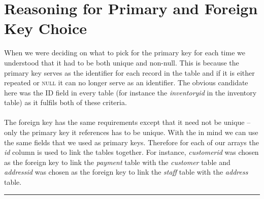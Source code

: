 \documentclass{article}
\begin{document}
\section{Reasoning for Primary and Foreign Key Choice}
	When we were deciding on what to pick for the primary key for each time we understood that it had to be both unique and non-null. 
	This is because the primary key serves as the identifier for each record in the table and if it is either repeated or \textsc{null} it can no longer serve as an identifier. 
	The obvious candidate here was  the ID field in every table (for instance the \emph{inventory\textunderscore id} in the inventory table) as it fulfils both of these criteria.
	\\\\
	The foreign key has the same requirements except that it need not be unique – only the primary key it references has to be unique. 
	With the in mind we can use the same fields that we used as primary keys. Therefore for each of our arrays the \emph{id} column is used to link the tables together. 
	For instance, \emph{customer\textunderscore id} was chosen as the foreign key to link the \emph{payment} table with the \emph{customer} table and \emph{address\textunderscore id} 
	was chosen as the foreign key to link the \emph{staff} table with the \emph{address} table.
	\\
	\rule{\textwidth}{0.4pt}
\end{document}
